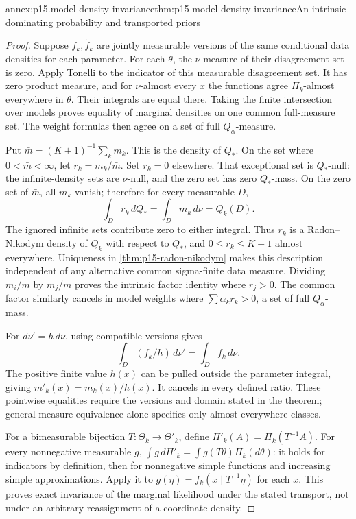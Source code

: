 \begin{annexitem}{annex:p15.model-density-invariance}{thm:p15-model-density-invariance}{An intrinsic dominating probability and transported priors}
\begin{proof}
Suppose \(f_k,\widetilde f_k\) are jointly measurable versions of the
same conditional data densities for each parameter. For each \(\theta\),
the \(\nu\)-measure of their disagreement set is zero. Apply Tonelli to
the indicator of this measurable disagreement set. It has zero product
measure, and for \(\nu\)-almost every \(x\) the functions agree
\(\Pi_k\)-almost everywhere in \(\theta\). Their integrals are equal
there. Taking the finite intersection over models proves equality of
marginal densities on one common full-measure set. The weight formulas
then agree on a set of full \(Q_\alpha\)-measure.

Put \(\bar m=(K+1)^{-1}\sum_km_k\). This is the density of \(Q_*\).
On the set where \(0<\bar m<\infty\), let \(r_k=m_k/\bar m\).
Set \(r_k=0\) elsewhere. That exceptional set is \(Q_*\)-null:
the infinite-density sets are \(\nu\)-null, and the zero set has zero
\(Q_*\)-mass. On the zero set of \(\bar m\), all \(m_k\) vanish;
therefore for every measurable \(D\),
\[
 \int_D r_k\,dQ_*=\int_Dm_k\,d\nu=Q_k(D).
\]
The ignored infinite sets contribute zero to either integral.
Thus \(r_k\) is a Radon--Nikodym density of \(Q_k\) with respect to
\(Q_*\), and \(0\leq r_k\leq K+1\) almost everywhere.
Uniqueness in \cref{thm:p15-radon-nikodym} makes this description
independent of any alternative common sigma-finite data measure.
Dividing \(m_i/\bar m\) by \(m_j/\bar m\) proves the intrinsic factor
identity where \(r_j>0\). The common factor similarly cancels in model
weights where \(\sum\alpha_kr_k>0\), a set of full \(Q_\alpha\)-mass.

For \(d\nu'=h\,d\nu\), using compatible versions gives
\[
 \int_D(f_k/h)\,d\nu'=\int_Df_k\,d\nu.
\]
The positive finite value \(h(x)\) can be pulled outside the parameter
integral, giving \(m'_k(x)=m_k(x)/h(x)\). It cancels in every defined
ratio. These pointwise equalities require the versions and domain stated
in the theorem; general measure equivalence alone specifies only
almost-everywhere classes.

For a bimeasurable bijection \(T:\Theta_k\to\Theta'_k\), define
\(\Pi'_k(A)=\Pi_k(T^{-1}A)\). For every nonnegative measurable \(g\),
\(\int g\,d\Pi'_k=\int g(T\theta)\Pi_k(d\theta)\): it holds for
indicators by definition, then for nonnegative simple functions and
increasing simple approximations. Apply it to
\(g(\eta)=f_k(x\mid T^{-1}\eta)\) for each \(x\).
This proves exact invariance of the marginal likelihood under the stated
transport, not under an arbitrary reassignment of a coordinate density.


\end{proof}
\end{annexitem}
